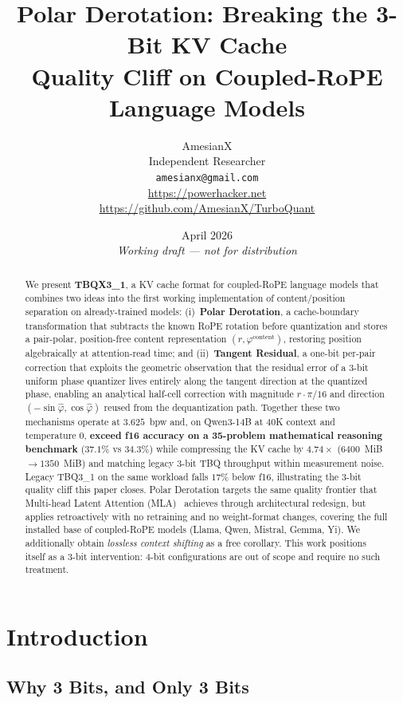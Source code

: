 \documentclass[10pt,twocolumn]{article}
\title{Polar Derotation: Breaking the 3-Bit KV Cache\\Quality Cliff on Coupled-RoPE Language Models}
\author{
AmesianX\\
Independent Researcher\\
\texttt{amesianx@gmail.com}\\
\url{https://powerhacker.net}\\
\url{https://github.com/AmesianX/TurboQuant}
}
\date{April 2026 \\ \textit{Working draft --- not for distribution}}
\begin{document}
\maketitle

\begin{abstract}
We present \textbf{TBQX3\_1}, a KV cache format for coupled-RoPE language models that combines two ideas into the first working implementation of content/position separation on already-trained models: (i)~\textbf{Polar Derotation}, a cache-boundary transformation that subtracts the known RoPE rotation before quantization and stores a pair-polar, position-free content representation $(r,\varphi^{\text{content}})$, restoring position algebraically at attention-read time; and (ii)~\textbf{Tangent Residual}, a one-bit per-pair correction that exploits the geometric observation that the residual error of a 3-bit uniform phase quantizer lives entirely along the tangent direction at the quantized phase, enabling an analytical half-cell correction with magnitude $r\cdot\pi/16$ and direction $(-\sin\hat\varphi,\cos\hat\varphi)$ reused from the dequantization path. Together these two mechanisms operate at $3.625$~bpw and, on Qwen3-14B at 40K context and temperature $0$, \textbf{exceed f16 accuracy on a 35-problem mathematical reasoning benchmark} ($37.1\%$ vs $34.3\%$) while compressing the KV cache by $4.74\times$ ($6400$~MiB $\to 1350$~MiB) and matching legacy 3-bit TBQ throughput within measurement noise. Legacy TBQ3\_1 on the same workload falls $17\%$ below f16, illustrating the 3-bit quality cliff this paper closes. Polar Derotation targets the same quality frontier that Multi-head Latent Attention (MLA)~\cite{deepseekv2} achieves through architectural redesign, but applies retroactively with no retraining and no weight-format changes, covering the full installed base of coupled-RoPE models (Llama, Qwen, Mistral, Gemma, Yi). We additionally obtain \emph{lossless context shifting} as a free corollary. This work positions itself as a 3-bit intervention: 4-bit configurations are out of scope and require no such treatment.
\end{abstract}

\section{Introduction}
\label{sec:intro}

\subsection{Why 3 Bits, and Only 3 Bits}
\label{sec:why3bit}
\end{document}
